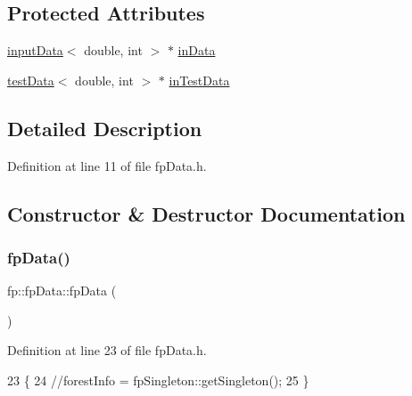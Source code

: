 \subsection*{Protected Attributes}
\begin{DoxyCompactItemize}
\item 
\hyperlink{classinputData}{input\+Data}$<$ double, int $>$ $\ast$ \hyperlink{classfp_1_1fpData_a49d7c3f58bcf88843c25b1b0c9714ebe}{in\+Data}
\item 
\hyperlink{classtestData}{test\+Data}$<$ double, int $>$ $\ast$ \hyperlink{classfp_1_1fpData_ad4f4dd3a8d15633b7f983932fa60bbad}{in\+Test\+Data}
\end{DoxyCompactItemize}


\subsection{Detailed Description}


Definition at line 11 of file fp\+Data.\+h.



\subsection{Constructor \& Destructor Documentation}
\mbox{\label{classfp_1_1fpData_a0e111a379a969d2ff0b3e8c5911cf78a}} 
\subsubsection{\texorpdfstring{fp\+Data()}{fpData()}}
{\footnotesize\ttfamily fp\+::fp\+Data\+::fp\+Data (\begin{DoxyParamCaption}{ }\end{DoxyParamCaption})\hspace{0.3cm}{\ttfamily [inline]}}



Definition at line 23 of file fp\+Data.\+h.


\begin{DoxyCode}
23                     \{
24                 \textcolor{comment}{//forestInfo = fpSingleton::getSingleton();}
25             \}
\end{DoxyCode}
\mbox{\label{classfp_1_1fpData_a62998c12f30ea88e6b3ea30b17d1a3e0}} 
